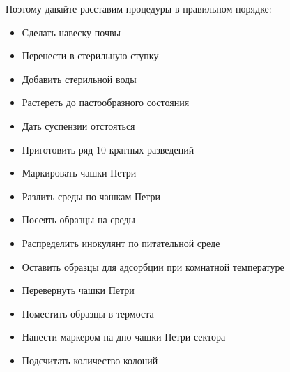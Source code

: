 Поэтому давайте расставим процедуры в правильном порядке:
\begin{itemize}
    \item Сделать навеску почвы
    \item Перенести в стерильную ступку
    \item Добавить стерильной воды
    \item Растереть до пастообразного состояния
    \item Дать суспензии отстояться
    \item Приготовить ряд 10-кратных разведений
    \item Маркировать чашки Петри
    \item Разлить среды по чашкам Петри
    \item Посеять образцы на среды
    \item Распределить инокулянт по питательной среде
    \item Оставить образцы для адсорбции при комнатной температуре
    \item Перевернуть чашки Петри
    \item Поместить образцы в термоста
    \item Нанести маркером на дно чашки Петри сектора
    \item Подсчитать количество колоний
\end{itemize}

